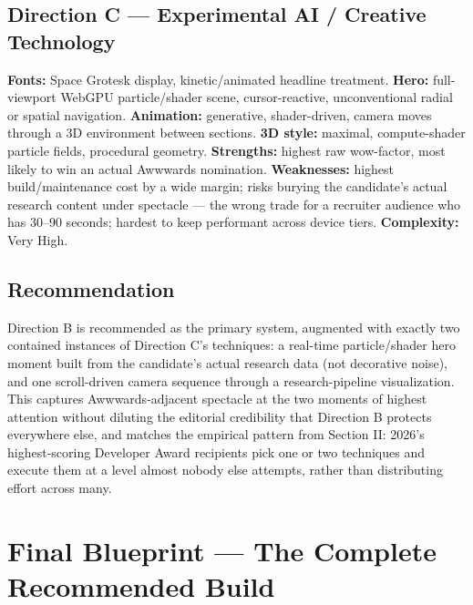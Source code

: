 \documentclass[conference]{IEEEtran}
\begin{document}
\subsection{Direction C --- Experimental AI / Creative Technology}
\noindent
{}
\par
\textbf{Fonts:} Space Grotesk display, kinetic/animated headline treatment. \textbf{Hero:} full-viewport WebGPU particle/shader scene, cursor-reactive, unconventional radial or spatial navigation. \textbf{Animation:} generative, shader-driven, camera moves through a 3D environment between sections. \textbf{3D style:} maximal, compute-shader particle fields, procedural geometry. \textbf{Strengths:} highest raw wow-factor, most likely to win an actual Awwwards nomination. \textbf{Weaknesses:} highest build/maintenance cost by a wide margin; risks burying the candidate's actual research content under spectacle --- the wrong trade for a recruiter audience who has 30--90 seconds; hardest to keep performant across device tiers. \textbf{Complexity:} Very High.

\subsection{Recommendation}
Direction B is recommended as the primary system, augmented with exactly two contained instances of Direction C's techniques: a real-time particle/shader hero moment built from the candidate's actual research data (not decorative noise), and one scroll-driven camera sequence through a research-pipeline visualization. This captures Awwwards-adjacent spectacle at the two moments of highest attention without diluting the editorial credibility that Direction B protects everywhere else, and matches the empirical pattern from Section II: 2026's highest-scoring Developer Award recipients pick one or two techniques and execute them at a level almost nobody else attempts, rather than distributing effort across many.

\section{Final Blueprint --- The Complete Recommended Build}
\end{document}
